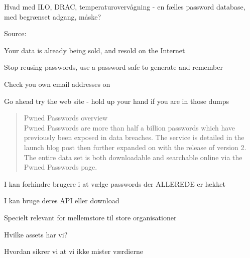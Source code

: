 \documentclass[Screen16to9,17pt]{foils}
\begin{document}
\vskip 1cm
Hvad med ILO, DRAC, temperaturovervågning - en fælles password database, med begrænset adgang, måske?




Source:




\begin{list1}
\item Your data is already being sold, and resold on the Internet
\item Stop reusing passwords, use a password safe to generate and remember
\item Check you own email addresses on 
\end{list1}

\centerline{Go ahead try the web site - hold up your hand if you are in those dumps}



\begin{quote}
Pwned Passwords overview\\
Pwned Passwords are more than half a billion passwords which have previously been exposed in data breaches. The service is detailed in the launch blog post then further expanded on with the release of version 2. The entire data set is both downloadable and searchable online via the Pwned Passwords page.
\end{quote}

\begin{list1}
\item I kan forhindre brugere i at vælge passwords der ALLEREDE er lækket
\item I kan bruge deres API eller download\\
{\footnotesize{}}
\end{list1}




\begin{list2}
\item Specielt relevant for mellemstore til store organisationer
\item Hvilke assets har vi?
\item Hvordan sikrer vi at vi ikke mister værdierne
\end{list2}
\end{document}
